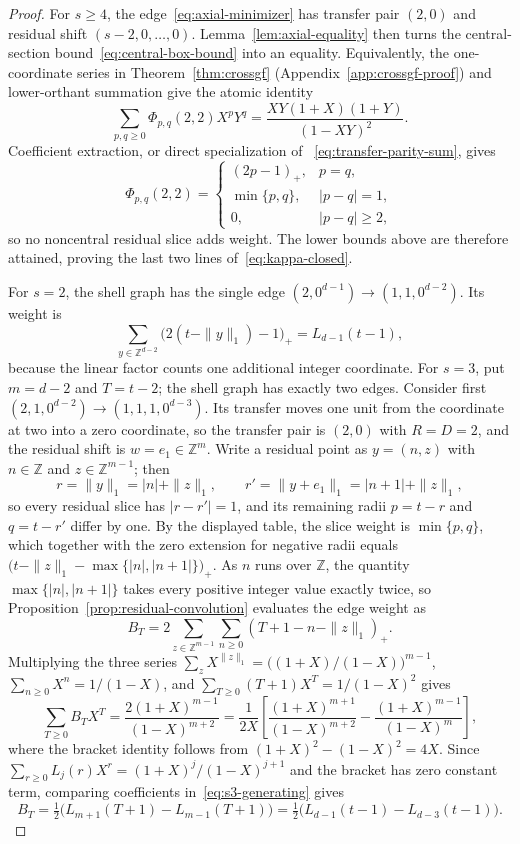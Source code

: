 \documentclass[pdflatex,sn-mathphys-num]{sn-jnl}
\theoremstyle{thmstyleone}
\theoremstyle{thmstylethree}
\theoremstyle{thmstyletwo}
\newcommand{\Z}{\mathbb Z}
\begin{document}
\begin{proof}
For $s\ge4$, the edge~\eqref{eq:axial-minimizer} has transfer pair $(2,0)$
and residual shift $(s-2,0,\ldots,0)$.  Lemma~\ref{lem:axial-equality} then
turns the central-section bound~\eqref{eq:central-box-bound} into an
equality.  Equivalently, the one-coordinate series in
Theorem~\ref{thm:crossgf} (Appendix~\ref{app:crossgf-proof}) and
lower-orthant summation give the atomic identity
\[
 \sum_{p,q\ge0}\Phi_{p,q}(2,2)X^pY^q
 =\frac{XY(1+X)(1+Y)}{(1-XY)^2}.
\]
Coefficient extraction, or direct specialization of
~\eqref{eq:transfer-parity-sum}, gives
\[
 \Phi_{p,q}(2,2)=
 \begin{cases}
  (2p-1)_+,&p=q,\\
  \min\{p,q\},&|p-q|=1,\\
  0,&|p-q|\ge2,
 \end{cases}
\]
so no noncentral residual slice adds weight.  The lower bounds above are
therefore attained, proving the last two lines of~\eqref{eq:kappa-closed}.

For $s=2$, the shell graph has the single edge
$(2,0^{d-1})\to(1,1,0^{d-2})$.  Its weight is
\[
 \sum_{y\in\Z^{d-2}}\bigl(2(t-\|y\|_1)-1\bigr)_+
 =L_{d-1}(t-1),
\]
because the linear factor counts one additional integer coordinate.
For $s=3$, put $m=d-2$ and $T=t-2$; the shell graph has exactly two edges.
Consider first $(2,1,0^{d-2})\to(1,1,1,0^{d-3})$.  Its transfer moves one
unit from the coordinate at two into a zero coordinate, so the transfer pair
is $(2,0)$ with $R=D=2$, and the residual shift is $w=e_1\in\Z^m$.  Write a
residual point as $y=(n,z)$ with $n\in\Z$ and $z\in\Z^{m-1}$; then
\[
 r=\|y\|_1=|n|+\|z\|_1,\qquad
 r'=\|y+e_1\|_1=|n+1|+\|z\|_1,
\]
so every residual slice has $|r-r'|=1$, and its remaining radii $p=t-r$ and
$q=t-r'$ differ by one.  By the displayed table, the slice weight is
$\min\{p,q\}$, which together with the zero extension for negative radii
equals $\bigl(t-\|z\|_1-\max\{|n|,|n+1|\}\bigr)_+$.  As $n$ runs over $\Z$,
the quantity $\max\{|n|,|n+1|\}$ takes every positive integer value exactly
twice, so Proposition~\ref{prop:residual-convolution} evaluates the edge
weight as
\begin{equation}
 B_T=2\sum_{z\in\Z^{m-1}}\sum_{n\ge0}
       (T+1-n-\|z\|_1)_+.                            \label{eq:s3-slice}
\end{equation}
Multiplying the three series
$\sum_{z}X^{\|z\|_1}=\bigl((1+X)/(1-X)\bigr)^{m-1}$,
$\sum_{n\ge0}X^n=1/(1-X)$, and $\sum_{T\ge0}(T+1)X^T=1/(1-X)^2$ gives
\begin{equation}
 \sum_{T\ge0}B_TX^T=
 \frac{2(1+X)^{m-1}}{(1-X)^{m+2}}
 =\frac1{2X}\left[
 \frac{(1+X)^{m+1}}{(1-X)^{m+2}}
 -\frac{(1+X)^{m-1}}{(1-X)^{m}}\right],              \label{eq:s3-generating}
\end{equation}
where the bracket identity follows from $(1+X)^2-(1-X)^2=4X$.  Since
$\sum_{r\ge0}L_j(r)X^r=(1+X)^j/(1-X)^{j+1}$ and the bracket has zero
constant term, comparing coefficients in~\eqref{eq:s3-generating} gives
\[
 B_T=\tfrac12\bigl(L_{m+1}(T+1)-L_{m-1}(T+1)\bigr)
 =\tfrac12\bigl(L_{d-1}(t-1)-L_{d-3}(t-1)\bigr).
\]


\end{proof}
\end{document}
